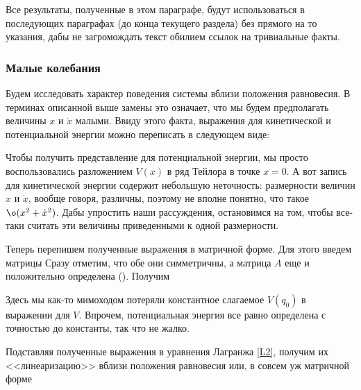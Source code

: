 \begin{nbb}
Все результаты, полученные в этом параграфе, будут
использоваться в последующих параграфах (до конца текущего раздела)
без прямого на то указания, дабы не загромождать текст обилием
ссылок на тривиальные факты.
\end{nbb}

\subsubsection{Малые колебания}

Будем исследовать характер поведения системы вблизи положения
равновесия. В терминах описанной выше замены это означает, что мы
будем предполагать величины $x$ и $\dot{x}$ малыми. Ввиду этого
факта, выражения для кинетической и потенциальной энергии можно
переписать в следующем виде:
\begin{note}
Чтобы получить представление для потенциальной энергии, мы просто
воспользовались разложением $V(x)$ в ряд Тейлора в точке $x=0$. А
вот запись для кинетической энергии содержит небольшую неточность:
размерности величин $x$ и $\dot{x}$, вообще говоря, различны,
поэтому не вполне понятно, что такое $\o(x^2+\dot{x}^2)$. Дабы
упростить наши рассуждения, остановимся на том, чтобы все-таки
считать эти величины приведенными к одной размерности.
\end{note}
Теперь перепишем полученные выражения в матричной форме. Для этого
введем матрицы  Сразу отметим, что обе они
симметричны, а матрица $A$ еще и положительно определена
(). Получим

\begin{nbb}
Здесь мы как-то мимоходом потеряли константное слагаемое
$V(q_0)$ в выражении для $V$. Впрочем, потенциальная энергия все
равно определена с точностью до константы, так что не жалко.
\end{nbb}
Подставляя полученные выражения в уравнения Лагранжа \eqref{L2},
получим их <<линеаризацию>> вблизи положения равновесия
\equ{a_{jk}^0\ddot{x}^k+c_{jk}^0x^k=0,} или, в совсем уж матричной
форме \eql{A\ddot{x}+Cx=0.}{L2lin}

